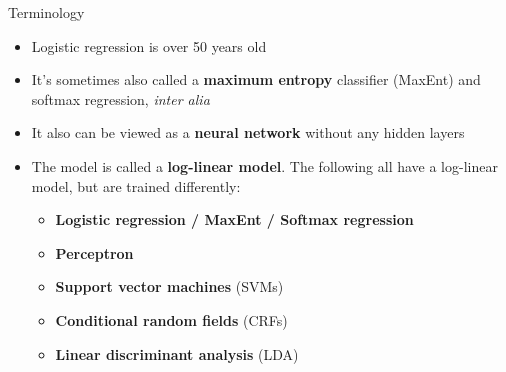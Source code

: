 \documentclass[xcolor=pdftex,x11names,table,hyperref]{beamer}
\begin{document}
\begin{frame}{Terminology}
\begin{itemize}
	\item Logistic regression is over 50 years old
	\pause
	\item It's sometimes also called a \textbf{maximum entropy} classifier (MaxEnt) and softmax regression, \textit{inter alia}
	\item It also can be viewed as a \textbf{neural network} without any hidden layers
	\pause
	\item The model is called a \textbf{log-linear model}.  The following all have a log-linear model, but are trained differently:
	\begin{itemize}
		\item \textbf{Logistic regression / MaxEnt / Softmax regression}
		\item \textbf{Perceptron}
		\item \textbf{Support vector machines} (SVMs)
		\item \textbf{Conditional random fields} (CRFs)
		\item \textbf{Linear discriminant analysis} (LDA)
	\end{itemize}
\end{itemize}
\end{frame}
\end{document}
